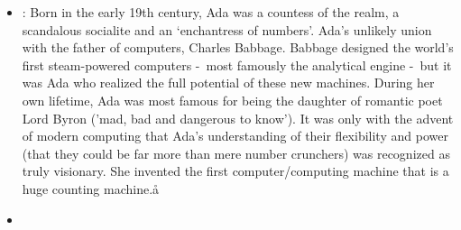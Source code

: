 \documentclass[12pt,a4paper]{article}
\begin{document}
\begin{enumerate}
\begin{itemize}
\begin{itemize}
      \end{itemize}
      \item {}: Born in the early 19th century, Ada was a countess of the realm, a scandalous socialite and an `enchantress of numbers'. Ada's unlikely union with the father of computers, Charles Babbage. Babbage designed the world's first steam-powered computers -\ most famously the analytical engine -\ but it was Ada who realized the full potential of these new machines. During her own lifetime, Ada was most famous for being the daughter of romantic poet Lord Byron ('mad, bad and dangerous to know'). It was only with the advent of modern computing that Ada's understanding of their flexibility and power (that they could be far more than mere number crunchers) was recognized as truly visionary. She invented the first computer/computing machine that is a huge counting machine.å
      \item {}

\end{itemize}
\end{enumerate}
\end{document}
